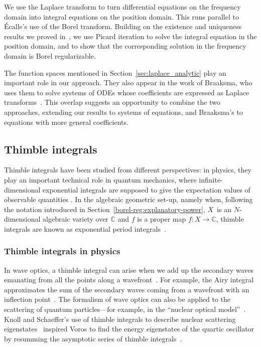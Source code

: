 \documentclass[pdftex]{sigma}
\newcommand{\maps}{\colon}
\newcommand{\C}{\mathbb{C}}
\numberwithin{equation}{section}
\begin{document}
We use the Laplace transform to turn differential equations on the frequency domain into integral equations on the position domain. This runs parallel to \'{E}calle's use of the Borel transform. Building on the existence and uniqueness results we proved in~\cite{reg-sing-volterra}, we use Picard iteration to solve the integral equation in the position domain, and to show that the corresponding solution in the frequency domain is Borel regularizable.

The function spaces mentioned in Section~\ref{sec:laplace_analytic} play an important role in our approach. They also appear in the work of Braaksma, who uses them to solve systems of ODEs whose coefficients are expressed as Laplace transforms~\cite{braaksma2006laplace}. This overlap suggests an opportunity to combine the two approaches, extending our results to systems of equations, and Braaksma's to equations with more general coefficients.
%
\subsection{Thimble integrals}
%
Thimble integrals have been studied from different perspectives: in physics, they play an important technical role in quantum mechanics, where infinite-dimensional exponential integrals are supposed to give the expectation values of observable quantities \cite{dunne-unsal2,dunne-unsal,Fauvet_Menous_Queva,Tanizaki:2014tua}. In the algebraic geometric set-up, namely when, following the notation introduced in Section~\ref{borel-reg:explanatory-power}, $X$~is an $N$-dimensional algebraic variety over $\C$ and $f$ is a proper map $f\maps X\to\C$, thimble integrals are known as exponential period integrals~\cite{deligne2007singularites,Maxim_lectures,kontsevich-Fourier-exact,kontsevich2024holomorphic,fresan-notes}.
\subsubsection{Thimble integrals in physics}
In wave optics, a thimble integral can arise when we add up the secondary waves emanating from all the points along a wavefront~\cite{Fenyes-ihes-lecture}. For example, the Airy integral approximates the sum of the secondary waves coming from a wavefront with an inflection point~\cite{rainbows+glories}. The formalism of wave optics can also be applied to the scattering of quantum particles---for example, in the ``nuclear optical model''~\cite{nuclear-mie,nuclear-optical}. Knoll and Schaeffer's use of thimble integrals to describe nuclear scattering eigenstates~\cite{semiclass-scat} inspired Voros to find the energy eigenstates of the quartic oscillator by resumming the asymptotic series of thimble integrals~\cite{quartic-return}.
\end{document}
